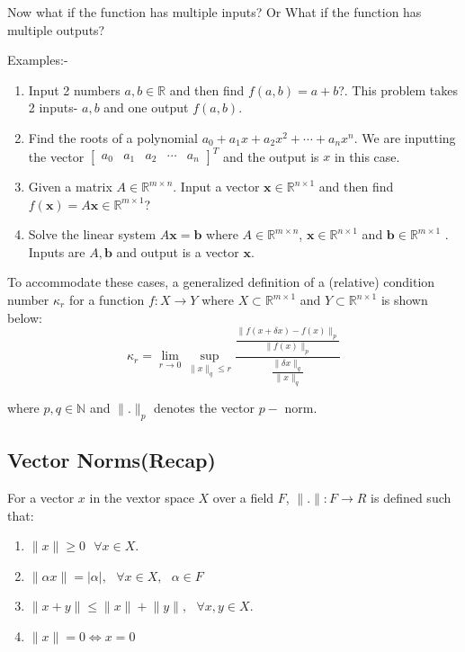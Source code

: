 \documentclass[
]{book}
\begin{document}
Now what if the function has multiple inputs? Or What if the function has multiple outputs?

Examples:-

\begin{enumerate}
\def\labelenumi{\arabic{enumi}.}
\item
  Input 2 numbers \(a,b\in\mathbb{R}\) and then find \(f(a,b) = a+b\)?. This problem takes 2 inputs- \(a, b\) and one output \(f(a,b)\).
\item
  Find the roots of a polynomial \(a_0+a_1x+a_2x^2+\cdots+ a_nx^n\). We are inputting the vector \(\begin{bmatrix} a_0 & a_1 & a_2 & \cdots & a_n\end{bmatrix}^T\) and the output is \(x\) in this case.
\item
  Given a matrix \(A\in\mathbb{R}^{m\times n}\). Input a vector \(\mathbf{x}\in\mathbb{R}^{n\times 1}\) and then find \(f(\mathbf{x}) = A\mathbf{x} \in \mathbb{R}^{m\times 1}\)?
\item
  Solve the linear system \(A\mathbf{x}=\mathbf{b}\) where \(A\in\mathbb{R}^{m\times n}\), \(\mathbf{x}\in\mathbb{R}^{n\times 1}\) and \(\mathbf{b}\in\mathbb{R}^{m\times 1}\) . Inputs are \(A, \mathbf{b}\) and output is a vector \(\mathbf{x}\).
\end{enumerate}

To accommodate these cases, a generalized definition of a (relative) condition number \(\kappa_r\) for a function \(f:X\to Y\) where \(X \subset \mathbb{R}^{m\times 1}\) and \(Y \subset \mathbb{R}^{n\times 1}\) is shown below:
\begin{equation}
  \kappa_r = \lim_{r\to 0} \sup_{\lVert x \rVert_q \le r} \frac{\frac{\lVert f(x+\delta x)-f(x) \rVert_p}{\lVert f(x) \rVert_p}}{\frac{\lVert \delta x \rVert_q}{\lVert x \rVert_q}}
\end{equation}

where \(p,q \in \mathbb{N}\) and \(\lVert . \rVert_p\) denotes the vector \(p-\) norm.

\hypertarget{vector-normsrecap}{%
\subsection{Vector Norms(Recap)}\label{vector-normsrecap}}

For a vector \(x\) in the vextor space \(X\) over a field \(F\), \(\lVert . \rVert:F\to R\) is defined such that:

\begin{enumerate}
\def\labelenumi{\arabic{enumi}.}
\item
  \(\lVert x \rVert\ge 0 \ \ \ \forall x \in X\).
\item
  \(\lVert \alpha x \rVert = \left\lvert{\alpha}\right\rvert, \ \ \ \forall x \in X, \ \ \ \alpha \in F\)
\item
  \(\lVert x+y \rVert \le \lVert x \rVert+\lVert y \rVert, \  \ \ \forall x,y \in X\).
\item
  \(\lVert x \rVert = 0 \Longleftrightarrow x = 0\)
\end{enumerate}
\end{document}
